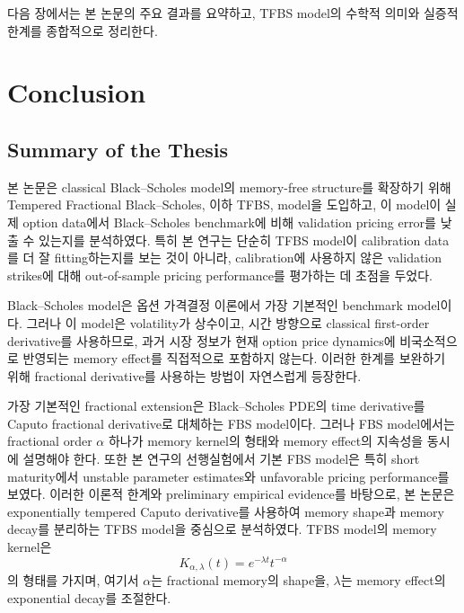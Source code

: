 \documentclass[11pt,a4paper]{report}
\begin{document}
다음 장에서는 본 논문의 주요 결과를 요약하고, TFBS model의 수학적 의미와 실증적 한계를 종합적으로 정리한다.


















\chapter{Conclusion}

\section{Summary of the Thesis}

본 논문은 classical Black--Scholes model의 memory-free structure를 확장하기 위해 Tempered Fractional Black--Scholes, 이하 TFBS, model을 도입하고, 이 model이 실제 option data에서 Black--Scholes benchmark에 비해 validation pricing error를 낮출 수 있는지를 분석하였다. 특히 본 연구는 단순히 TFBS model이 calibration data를 더 잘 fitting하는지를 보는 것이 아니라, calibration에 사용하지 않은 validation strikes에 대해 out-of-sample pricing performance를 평가하는 데 초점을 두었다.

Black--Scholes model은 옵션 가격결정 이론에서 가장 기본적인 benchmark model이다. 그러나 이 model은 volatility가 상수이고, 시간 방향으로 classical first-order derivative를 사용하므로, 과거 시장 정보가 현재 option price dynamics에 비국소적으로 반영되는 memory effect를 직접적으로 포함하지 않는다. 이러한 한계를 보완하기 위해 fractional derivative를 사용하는 방법이 자연스럽게 등장한다.

가장 기본적인 fractional extension은 Black--Scholes PDE의 time derivative를 Caputo fractional derivative로 대체하는 FBS model이다. 그러나 FBS model에서는 fractional order \(\alpha\) 하나가 memory kernel의 형태와 memory effect의 지속성을 동시에 설명해야 한다. 또한 본 연구의 선행실험에서 기본 FBS model은 특히 short maturity에서 unstable parameter estimates와 unfavorable pricing performance를 보였다. 이러한 이론적 한계와 preliminary empirical evidence를 바탕으로, 본 논문은 exponentially tempered Caputo derivative를 사용하여 memory shape과 memory decay를 분리하는 TFBS model을 중심으로 분석하였다. TFBS model의 memory kernel은
\[
K_{\alpha,\lambda}(t)
=
e^{-\lambda t}t^{-\alpha}
\]
의 형태를 가지며, 여기서 \(\alpha\)는 fractional memory의 shape을, \(\lambda\)는 memory effect의 exponential decay를 조절한다.
\end{document}
